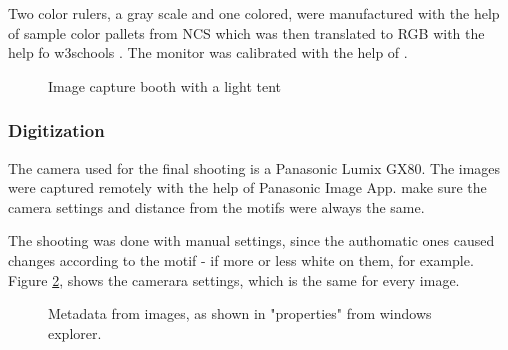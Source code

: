 \documentclass[12 pt]{paper}
\begin{document}
Two color rulers, a gray scale and one colored,  were manufactured with the help of sample color pallets from NCS which was then translated to RGB with the help fo w3schools \autocite[]{w3}. The monitor was calibrated with the help of \textcite[]{koch2007}. 


\begin{figure}[!htb]
	\centering
	\caption[short:]{Image capture booth with a light tent}
	\label{ruler}
\end{figure}



\subsubsection{Digitization}

  The camera used for the final shooting is a Panasonic Lumix GX80. The images were captured remotely with the help of Panasonic Image App. make sure the camera settings and distance from the motifs were always the same. 
  
  The shooting was done with manual settings, since the authomatic ones caused changes according to the motif - if more or less white on them, for example. Figure \ref{tekniskMetatada}, shows the camerara settings, which is the same for every image.
  
  
  \begin{figure}[!htb]
  	\centering
  	\caption[short:]{Metadata from images, as shown in "properties" from windows explorer.}
  	\label{tekniskMetatada}
  \end{figure}
  
\end{document}
